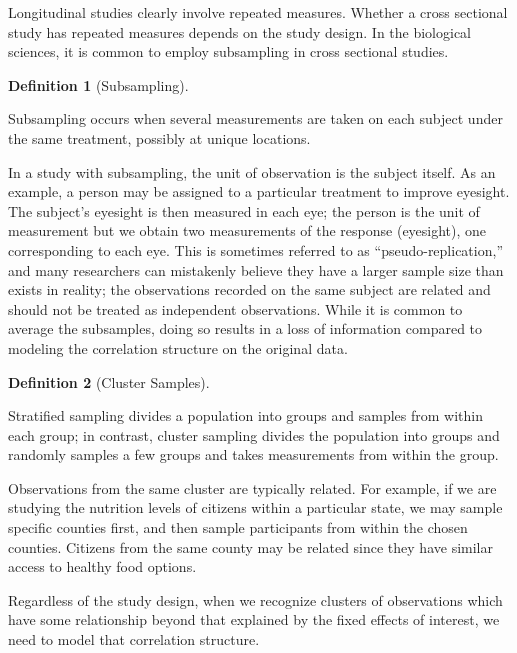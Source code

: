 \documentclass[
  letterpaper,
  DIV=11,
  numbers=noendperiod]{scrreprt}
\theoremstyle{definition}
\newtheorem{definition}{Definition}[chapter]
\theoremstyle{definition}
\theoremstyle{remark}
\begin{document}
Longitudinal studies clearly involve repeated measures. Whether a cross
sectional study has repeated measures depends on the study design. In
the biological sciences, it is common to employ subsampling in cross
sectional studies.

\begin{definition}[Subsampling]\protect\hypertarget{def-subsampling}{}\label{def-subsampling}

Subsampling occurs when several measurements are taken on each subject
under the same treatment, possibly at unique locations.

\end{definition}

In a study with subsampling, the unit of observation is the subject
itself. As an example, a person may be assigned to a particular
treatment to improve eyesight. The subject's eyesight is then measured
in each eye; the person is the unit of measurement but we obtain two
measurements of the response (eyesight), one corresponding to each eye.
This is sometimes referred to as ``pseudo-replication,'' and many
researchers can mistakenly believe they have a larger sample size than
exists in reality; the observations recorded on the same subject are
related and should not be treated as independent observations. While it
is common to average the subsamples, doing so results in a loss of
information compared to modeling the correlation structure on the
original data.

\begin{definition}[Cluster
Samples]\protect\hypertarget{def-cluster-samples}{}\label{def-cluster-samples}

Stratified sampling divides a population into groups and samples from
within each group; in contrast, cluster sampling divides the population
into groups and randomly samples a few groups and takes measurements
from within the group.

\end{definition}

Observations from the same cluster are typically related. For example,
if we are studying the nutrition levels of citizens within a particular
state, we may sample specific counties first, and then sample
participants from within the chosen counties. Citizens from the same
county may be related since they have similar access to healthy food
options.

Regardless of the study design, when we recognize clusters of
observations which have some relationship beyond that explained by the
fixed effects of interest, we need to model that correlation structure.
\end{document}
